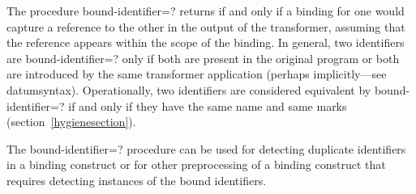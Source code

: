 \begin{entry}{%
}

The procedure {\cf bound-identifier=?} returns \schtrue{} if and only if a
binding for one would capture a reference to the other in the output of
the transformer, assuming that the reference appears within the scope of
the binding.
In general, two identifiers are {\cf bound-identifier=?} only if
both are present in the original program or both are introduced by the
same transformer application
(perhaps implicitly---see {\cf datum\coerce{}syntax}).
Operationally, two identifiers are
considered equivalent by {\cf bound-identifier=?} if and only if they
have the same name and same marks (section~\ref{hygienesection}).

The {\cf bound-identifier=?} procedure can be used for detecting
duplicate identifiers in a binding construct or for other
preprocessing of a binding construct that requires detecting instances
of the bound identifiers.
\end{entry}

